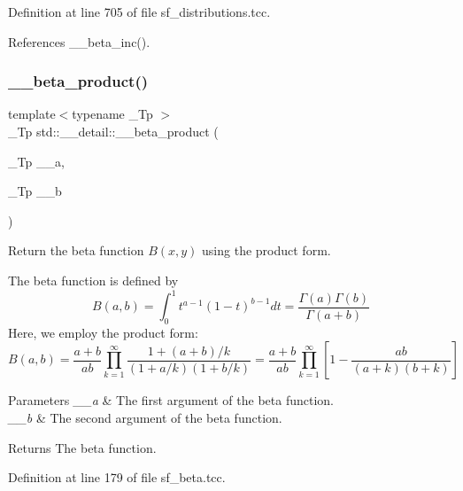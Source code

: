 Definition at line 705 of file sf\+\_\+distributions.\+tcc.



References \+\_\+\+\_\+beta\+\_\+inc().

\mbox{\label{namespacestd_1_1____detail_a9baa688a27befab7fa48ccfb4a87a9ca}} 
\subsubsection{\texorpdfstring{\+\_\+\+\_\+beta\+\_\+product()}{\_\_beta\_product()}}
{\footnotesize\ttfamily template$<$typename \+\_\+\+Tp $>$ \\
\+\_\+\+Tp std\+::\+\_\+\+\_\+detail\+::\+\_\+\+\_\+beta\+\_\+product (\begin{DoxyParamCaption}\item[{\+\_\+\+Tp}]{\+\_\+\+\_\+a,  }\item[{\+\_\+\+Tp}]{\+\_\+\+\_\+b }\end{DoxyParamCaption})}



Return the beta function $B(x,y)$ using the product form. 

The beta function is defined by \[ B(a,b) = \int_0^1 t^{a - 1} (1 - t)^{b - 1} dt = \frac{\Gamma(a)\Gamma(b)}{\Gamma(a+b)} \] Here, we employ the product form\+: \[ B(a,b) = \frac{a + b}{a b} \prod_{k=1}^{\infty} \frac{1 + (a + b) / k}{(1 + a / k) (1 + b / k)} = \frac{a + b}{ab} \prod_{k=1}^{\infty} \left[1 - \frac{ab}{(a + k)(b + k)}\right] \]


\begin{DoxyParams}{Parameters}
{\em \+\_\+\+\_\+a} & The first argument of the beta function. \\
\hline
{\em \+\_\+\+\_\+b} & The second argument of the beta function. \\
\hline
\end{DoxyParams}
\begin{DoxyReturn}{Returns}
The beta function. 
\end{DoxyReturn}


Definition at line 179 of file sf\+\_\+beta.\+tcc.

\mbox{\label{namespacestd_1_1____detail_a4483574682ad034be17c75ef29892b02}} 
